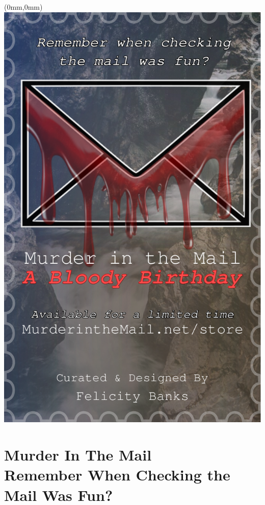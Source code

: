 \documentclass[11.75pt,openany,final]{memoir}
\begin{document}
 \chapter*{}
  \begin{textblock*}{70.9mm}(0mm,0mm)
    \includegraphics[width=\paperwidth]{./media/images/murder_ad}
  \end{textblock*}
  \chapter{Murder In The Mail\\ \small{Remember When Checking the Mail Was Fun?}}
 \label{sec:murder}
 


% 

\end{document}
